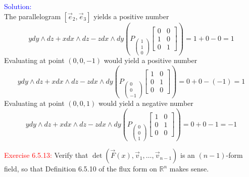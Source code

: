 \documentclass[12pt]{article}
\begin{document}
\textcolor{blue}{Solution:} \\
    The parallelogram $[\vec e_2, \vec e_3]$ yields a positive number
    \[
        ydy\wedge dz + xdx\wedge dz-zdx\wedge dy 
        \left(
            P_{\begin{pmatrix} 1 \\ 1 \\ 0 \end{pmatrix}}
            \begin{bmatrix}
                0 & 0\\
                1 & 0\\
                0 & 1
            \end{bmatrix}
        \right)
        = 1 + 0 - 0
        = 1
    \]
    Evaluating at point $(0, 0, -1)$ would yield a positive number
    \[
        ydy\wedge dz + xdx\wedge dz-zdx\wedge dy 
        \left(
            P_{\begin{pmatrix} 0 \\ 0 \\ -1 \end{pmatrix}}
            \begin{bmatrix}
                1 & 0\\
                0 & 1\\
                0 & 0
            \end{bmatrix}
        \right)
        = 0 + 0 -(-1)
        = 1
    \]
    Evaluating at point $(0, 0, 1)$ would yield a negative number
    \[
        ydy\wedge dz + xdx\wedge dz-zdx\wedge dy
        \left(
            P_{\begin{pmatrix} 0 \\ 0 \\ 1 \end{pmatrix}}
            \begin{bmatrix}
                1 & 0\\
                0 & 1\\
                0 & 0
            \end{bmatrix}
        \right)   
        = 0 + 0 - 1
        = -1
    \]
\newpage











\textcolor{red}{Exercise 6.5.13:}
Verify that $\det(\vec F(x),\vec v_1,\dots,\vec v_{n-1})$ is an $(n-1)$-form field, so that Definition 6.5.10 of the flux form on $\mathbb R^n$ makes sense.
\end{document}
